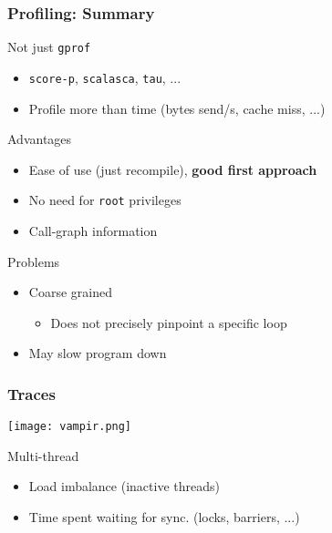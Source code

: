 \documentclass[xcolor={x11names,svgnames}]{beamer}
\begin{document}

\begin{frame}
  \frametitle{Profiling: Summary}
  
  \begin{block}{Not just \texttt{gprof}}
    \begin{itemize}
    \item \texttt{score-p}, \texttt{scalasca}, \texttt{tau}, ...
    \item Profile more than time (bytes send/s, cache miss, ...)
    \end{itemize}
  \end{block}
  
  \begin{exampleblock}{Advantages}
    \begin{itemize}
    \item Ease of use (just recompile), \textbf{good first approach}
    \item No need for \texttt{root} privileges
    \item Call-graph information
    \end{itemize}
  \end{exampleblock}
    
  \begin{alertblock}{Problems}
    \begin{itemize}
    \item Coarse grained
      \begin{itemize}
      \item Does not precisely pinpoint a specific loop
      \end{itemize}
    \item May slow program down
    \end{itemize}
  \end{alertblock}
\end{frame}


\begin{frame}
  \frametitle{Traces}

  \begin{center}
    \texttt{[image: vampir.png]}
  \end{center}

\begin{block}{Multi-thread}
    \begin{itemize}
    \item Load imbalance (inactive threads)
    \item Time spent waiting for sync. (locks, barriers, ...)
    \end{itemize}
  \end{block}
  
\end{frame}
\end{document}
